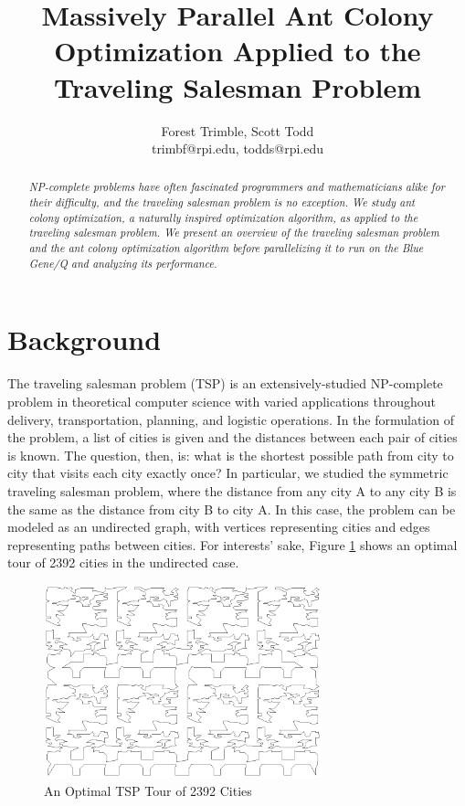 \documentclass[twocolumn]{article}
\title{Massively Parallel Ant Colony Optimization Applied to the Traveling Salesman Problem}
\author{Forest Trimble, Scott Todd\\trimbf@rpi.edu, todds@rpi.edu}
\begin{document}
\maketitle

\pagestyle{fancy}
\fancyhead{}
\fancyhead[R]{\today}


\begin{abstract}
  \emph{NP-complete problems have often fascinated programmers and mathematicians alike
  for their difficulty, and the traveling salesman problem is no exception. We 
  study ant colony optimization, a naturally inspired optimization algorithm,
  as applied to the traveling salesman problem. We present an overview of
  the traveling salesman problem and the ant colony optimization algorithm before
  parallelizing it to run on the Blue Gene/Q and analyzing its performance. }
\end{abstract}

\section{Background} \label{sec:tsp}

The traveling salesman problem (TSP) is an extensively-studied NP-complete problem 
in theoretical computer science with varied applications throughout delivery, 
transportation, planning, and logistic operations. In the formulation of the 
problem, a list of cities is given and the distances between each pair of cities
is known. The question, then, is: what is the shortest possible path from city to
city that visits each city exactly once? In particular, we studied the symmetric
traveling salesman problem, where the distance from any city A to any city B
is the same as the distance from city B to city A. In this case, the problem
can be modeled as an undirected graph, with vertices representing cities and
edges representing paths between cities. For interests' sake, Figure \ref{fig:opt2392}
shows an optimal tour of 2392 cities in the undirected case. \\

\begin{figure}
  \centering
  \includegraphics[height=2.2in]{plots/pr2392.eps}
  \caption{An Optimal TSP Tour of 2392 Cities} \label{fig:opt2392}
\end{figure}
\end{document}
